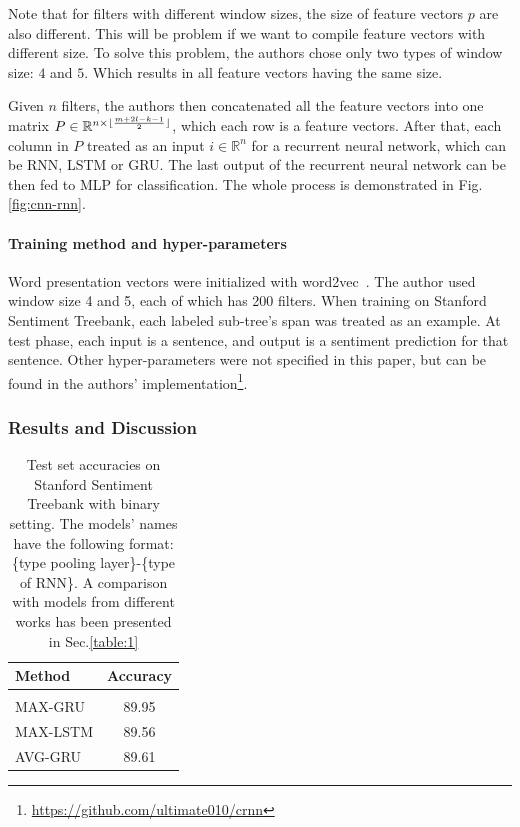 Note that for filters with different window sizes, the size of feature vectors \(p\) are also different. 
This will be problem if we want to compile feature vectors with different size.
To solve this problem, the authors chose only two types of window size: \(4\) and \(5\).
Which results in all feature vectors having the same size. 

Given \(n\) filters, the authors then concatenated all the feature vectors into one matrix \(P \in \mathbb{R}^{n \times \lfloor \frac{m + 2l - k - 1}{2} \rfloor}\), which each row is a feature vectors. 
After that, each column in \(P\) treated as an input \(i \in \mathbb{R}^{n}\) for a recurrent neural network, which can be RNN, LSTM or GRU.
The last output of the recurrent neural network can be then fed to MLP for classification.
The whole process is demonstrated in Fig.\ref{fig:cnn-rnn}.

\paragraph{Training method and hyper-parameters} 
Word presentation vectors were initialized with word2vec~\cite{word2vec}.
The author used window size 4 and 5, each of which has 200 filters. 
When training on Stanford Sentiment Treebank, each labeled sub-tree's span was treated as an example.
At test phase, each input is a sentence, and output is a sentiment prediction for that sentence.
Other hyper-parameters were not specified in this paper, but can be found in the authors' implementation\footnote{\url{https://github.com/ultimate010/crnn}}.

\subsubsection{Results and Discussion}
\begin{table}[H]
\centering
\begin{tabular}{l c} 
 \hline
 \hline 
 Method & Accuracy \\ [0.5ex] 
 \hline
 \hline
 \\  
 MAX-GRU & 89.95 \\ 
 MAX-LSTM & 89.56 \\ 
 AVG-GRU & 89.61 \\ 
 \hline
 \hline
\end{tabular}
\caption[CNN-RNN test result]{Test set accuracies on Stanford Sentiment Treebank with binary setting. 
The models' names have the following format: \{type pooling layer\}-\{type of RNN\}.
A comparison with models from different works has been presented in Sec.\ref{table:1}}
\label{table:cnn-rnn}
\end{table}

